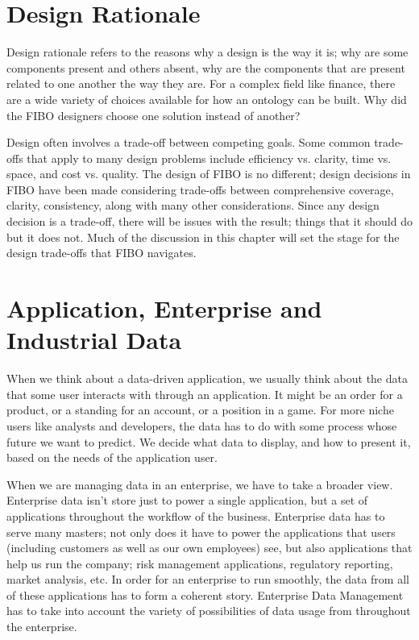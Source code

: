 \section{Design Rationale}

Design rationale refers to the reasons why a design is the way it is; why are some components present and others absent, why are the components that are present related to one another the way they are.  For a complex field like finance, there are a wide variety of choices available for how an ontology can be built.  Why did the FIBO designers choose one solution instead of another? 

Design often involves a trade-off between competing goals.  Some common trade-offs that apply to many design problems include efficiency vs. clarity, time vs. space, and cost vs. quality.  The design of FIBO is no different; design decisions in FIBO have been made considering trade-offs between comprehensive coverage, clarity, consistency, along with many other considerations.   Since any design decision is a trade-off, there will be issues with the result; things that it should do but it does not.  Much of the discussion in this chapter will set the stage for the design trade-offs that FIBO navigates.


\section{Application, Enterprise and Industrial Data}
\label{ch01.sec1}

When we think about a data-driven application, we usually think about the data that some user interacts with through an application.  It might be an order for a product, or a standing for an account, or a position in a game.  For more niche users like analysts and developers, the data has to do with some process whose future we want to predict.  We decide what data to display, and how to present it, based on the needs of the application user. 

When we are managing data in an enterprise, we have to take a broader view.  Enterprise data isn't store just to power a single application, but a set of applications throughout the workflow of the business.  Enterprise data has to serve many masters; not only does it have to power the applications that users (including customers as well as our own employees) see, but also applications that help us run the company; risk management applications, regulatory reporting, market analysis, etc.  In order for an enterprise to run smoothly, the data from all of these applications has to form a coherent story.  Enterprise Data Management has to take into account the variety of possibilities of data usage from throughout the enterprise. 

